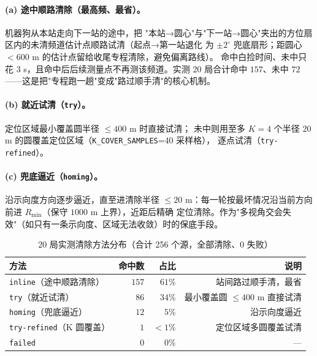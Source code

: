 \paragraph{(a) 途中顺路清除（最高频、最省）。} 机器狗从本站走向下一站的途中，把
"本站→圆心"与"下一站→圆心"夹出的方位扇区内的未清频道估计点顺路试清（起点→第一站退化
为 $\pm 2^\circ$ 兜底扇形；距圆心 $<600$ m 的估计点留给收尾专程清除，避免偏离路线）。
命中白捡时间、未中只花 $3$ s，且命中后后续测量点不再测该频道。实测 20 局合计命中
$157$、未中 $72$——这是把"专程跑一趟"变成"路过顺手清"的核心机制。

\paragraph{(b) 就近试清（\texttt{try}）。} 定位区域最小覆盖圆半径 $\le 400$ m 时直接试清；
未中则用至多 $K=4$ 个半径 $20$ m 的圆覆盖定位区域（\texttt{K\_COVER\_SAMPLES}=40 采样格），
逐点试清（\texttt{try-refined}）。

\paragraph{(c) 兜底逼近（\texttt{homing}）。} 沿示向度方向逐步逼近，直至进清除半径
$\le 20$ m：每一轮按最坏情况沿当前方向前进 $R_{\min}$（保守 $1000$ m 上界），近距后精确
定位清除。作为"多视角交会失效"（如只有一条示向度、区域无法收敛）时的保底手段。

\begin{table}[H]
  \centering
  \caption{20 局实测清除方法分布（合计 256 个源，全部清除、0 失败）}
  \label{tab:methods}
  \begin{tabular}{lrrr}
    \toprule
    \textbf{方法} & \textbf{命中数} & \textbf{占比} & \textbf{说明} \\
    \midrule
    \texttt{inline}（途中顺路清除） & $157$ & $61\%$ & 站间路过顺手清，最省 \\
    \texttt{try}（就近试清）        & $86$  & $34\%$ & 最小覆盖圆 $\le 400$ m 直接试清 \\
    \texttt{homing}（兜底逼近）     & $12$  & $5\%$  & 沿示向度逼近 \\
    \texttt{try-refined}（K 圆覆盖）& $1$   & $<1\%$ & 定位区域多圆覆盖试清 \\
    \texttt{failed}                 & $0$   & $0\%$  & --- \\
    \bottomrule
  \end{tabular}
\end{table}